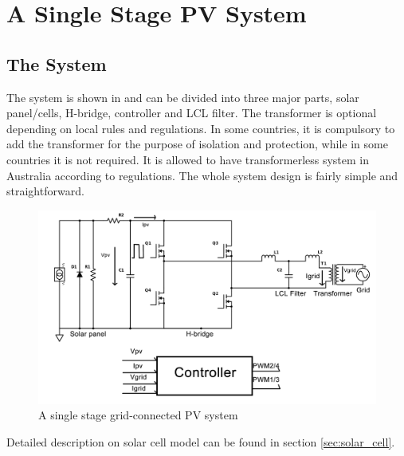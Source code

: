 \chapter{A Single Stage PV System}\label{ch:system_description}
\section{The System}
The system is shown in  and can be divided into three major parts, solar panel/cells, H-bridge, controller and  LCL filter. The transformer is optional depending on local rules and regulations. In some countries, it is compulsory to add the transformer for the purpose of isolation and protection, while in some countries it is not required. It is allowed to have transformerless system in Australia according to regulations\cite{ASNZS-5033-2014}. The whole system design is fairly simple and straightforward. 
\begin{figure}[!b]
\centering
    \includegraphics[width = 1\textwidth]{figures/system_diagram.png}
    \caption{A single stage grid-connected PV system}
    \label{fig:sys_gram}	
\end{figure}
Detailed description on solar cell model can be found in section \ref{sec:solar_cell}. 

